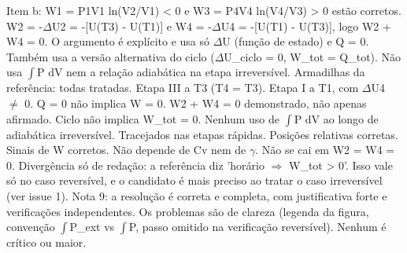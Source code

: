 \documentclass{article}%
\begin{document}
\newline%
Item b: W1 = P1V1 ln(V2/V1) < 0 e W3 = P4V4 ln(V4/V3) > 0 estão corretos. W2 = -$\Delta$U2 = -{[}U(T3) - U(T1){]} e W4 = -$\Delta$U4 = -{[}U(T1) - U(T3){]}, logo W2 + W4 = 0. O argumento é explícito e usa só $\Delta$U (função de estado) e Q = 0. Também usa a versão alternativa do ciclo ($\Delta$U\_ciclo = 0, W\_tot = Q\_tot). Não usa $\int$P dV nem a relação adiabática na etapa irreversível.\newline%
\newline%
Armadilhas da referência: todas tratadas. Etapa III a T3 (T4 = T3). Etapa I a T1, com $\Delta$U4 $\neq$ 0. Q = 0 não implica W = 0. W2 + W4 = 0 demonstrado, não apenas afirmado. Ciclo não implica W\_tot = 0. Nenhum uso de $\int$P dV ao longo de adiabática irreversível. Tracejados nas etapas rápidas. Posições relativas corretas. Sinais de W corretos. Não depende de Cv nem de $\gamma$. Não se cai em W2 = W4 = 0.\newline%
\newline%
Divergência só de redação: a referência diz 'horário $\Rightarrow$ W\_tot > 0'. Isso vale só no caso reversível, e o candidato é mais preciso ao tratar o caso irreversível (ver issue 1).\newline%
\newline%
Nota 9: a resolução é correta e completa, com justificativa forte e verificações independentes. Os problemas são de clareza (legenda da figura, convenção $\int$P\_ext vs $\int$P, passo omitido na verificação reversível). Nenhum é crítico ou maior.%
\end{document}
